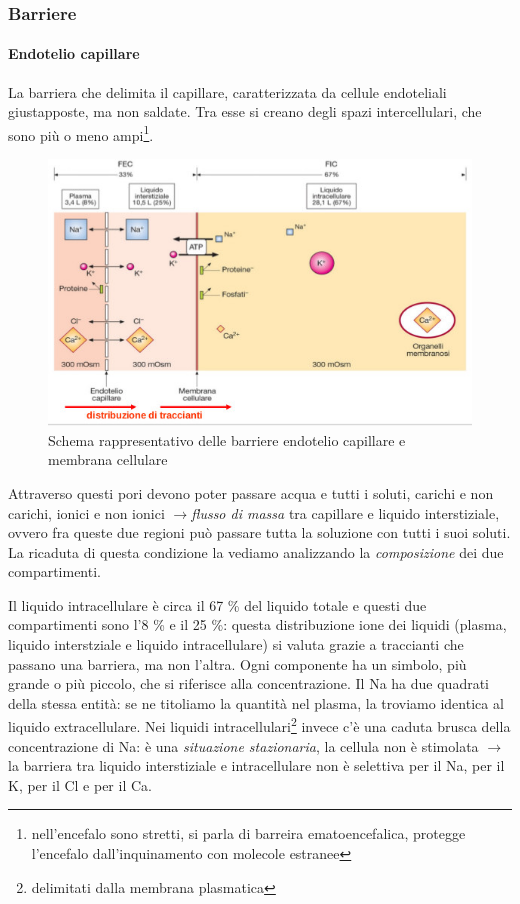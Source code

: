 \documentclass[a4paper,12pt]{article}
\newcommand{\lfreccia}{\ensuremath{\longrightarrow}}
\begin{document}
\subsubsection{Barriere}

\paragraph{Endotelio capillare}
La barriera che delimita il capillare, caratterizzata da cellule endoteliali giustapposte, ma non saldate. Tra esse si creano degli spazi intercellulari, che sono più o meno ampi\footnote{nell'encefalo sono stretti, si parla di barreira ematoencefalica, protegge l'encefalo dall'inquinamento con molecole estranee}. 
\begin{figure}[H]
\centering
\includegraphics[scale=0.45]{immagine/endotelio.jpg}
\caption{Schema rappresentativo delle barriere endotelio capillare e membrana cellulare}
\end{figure}

Attraverso questi pori devono poter passare acqua e tutti i soluti, carichi e non carichi, ionici e non ionici \lfreccia \emph{flusso di massa} tra capillare e liquido interstiziale, ovvero fra queste due regioni può passare tutta la soluzione con tutti i suoi soluti. La ricaduta di questa condizione la vediamo analizzando la \emph{composizione} dei due compartimenti.

Il liquido intracellulare è circa il 67 \% del liquido totale e questi due compartimenti sono l'8 \% e il 25 \%: questa distribuzione ione dei liquidi (plasma, liquido interstziale e liquido intracellulare) si valuta grazie a traccianti che passano una barriera, ma non l'altra. Ogni componente ha un simbolo, più grande o più piccolo, che si riferisce alla concentrazione. Il Na ha due quadrati della stessa entità: se ne titoliamo la quantità nel plasma, la troviamo identica al liquido extracellulare. Nei liquidi intracellulari\footnote{delimitati dalla membrana plasmatica} invece c'è una caduta brusca della concentrazione di Na: è una \emph{situazione stazionaria}, la cellula non è stimolata \lfreccia la barriera tra liquido interstiziale e intracellulare non è selettiva per il Na, per il K, per il Cl e per il Ca. 
\end{document}

